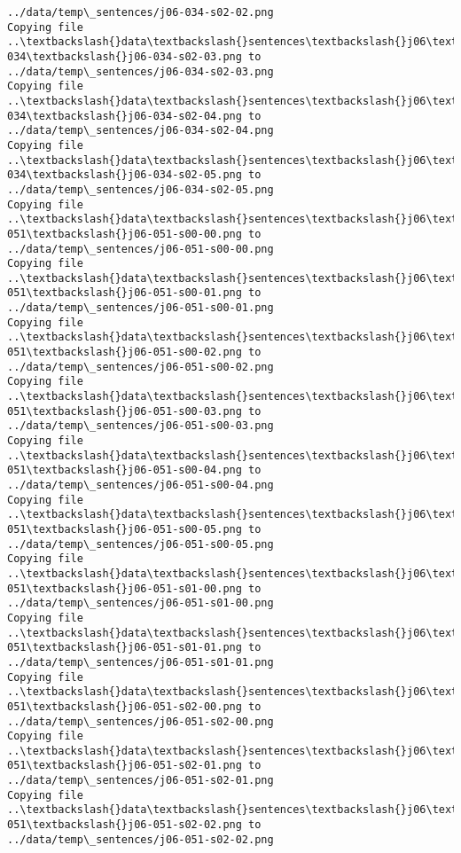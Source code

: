 \documentclass[11pt]{article}
\begin{document}
\begin{Verbatim}[commandchars=\\\{\}]
../data/temp\_sentences/j06-034-s02-02.png
Copying file ..\textbackslash{}data\textbackslash{}sentences\textbackslash{}j06\textbackslash{}j06-034\textbackslash{}j06-034-s02-03.png to
../data/temp\_sentences/j06-034-s02-03.png
Copying file ..\textbackslash{}data\textbackslash{}sentences\textbackslash{}j06\textbackslash{}j06-034\textbackslash{}j06-034-s02-04.png to
../data/temp\_sentences/j06-034-s02-04.png
Copying file ..\textbackslash{}data\textbackslash{}sentences\textbackslash{}j06\textbackslash{}j06-034\textbackslash{}j06-034-s02-05.png to
../data/temp\_sentences/j06-034-s02-05.png
Copying file ..\textbackslash{}data\textbackslash{}sentences\textbackslash{}j06\textbackslash{}j06-051\textbackslash{}j06-051-s00-00.png to
../data/temp\_sentences/j06-051-s00-00.png
Copying file ..\textbackslash{}data\textbackslash{}sentences\textbackslash{}j06\textbackslash{}j06-051\textbackslash{}j06-051-s00-01.png to
../data/temp\_sentences/j06-051-s00-01.png
Copying file ..\textbackslash{}data\textbackslash{}sentences\textbackslash{}j06\textbackslash{}j06-051\textbackslash{}j06-051-s00-02.png to
../data/temp\_sentences/j06-051-s00-02.png
Copying file ..\textbackslash{}data\textbackslash{}sentences\textbackslash{}j06\textbackslash{}j06-051\textbackslash{}j06-051-s00-03.png to
../data/temp\_sentences/j06-051-s00-03.png
Copying file ..\textbackslash{}data\textbackslash{}sentences\textbackslash{}j06\textbackslash{}j06-051\textbackslash{}j06-051-s00-04.png to
../data/temp\_sentences/j06-051-s00-04.png
Copying file ..\textbackslash{}data\textbackslash{}sentences\textbackslash{}j06\textbackslash{}j06-051\textbackslash{}j06-051-s00-05.png to
../data/temp\_sentences/j06-051-s00-05.png
Copying file ..\textbackslash{}data\textbackslash{}sentences\textbackslash{}j06\textbackslash{}j06-051\textbackslash{}j06-051-s01-00.png to
../data/temp\_sentences/j06-051-s01-00.png
Copying file ..\textbackslash{}data\textbackslash{}sentences\textbackslash{}j06\textbackslash{}j06-051\textbackslash{}j06-051-s01-01.png to
../data/temp\_sentences/j06-051-s01-01.png
Copying file ..\textbackslash{}data\textbackslash{}sentences\textbackslash{}j06\textbackslash{}j06-051\textbackslash{}j06-051-s02-00.png to
../data/temp\_sentences/j06-051-s02-00.png
Copying file ..\textbackslash{}data\textbackslash{}sentences\textbackslash{}j06\textbackslash{}j06-051\textbackslash{}j06-051-s02-01.png to
../data/temp\_sentences/j06-051-s02-01.png
Copying file ..\textbackslash{}data\textbackslash{}sentences\textbackslash{}j06\textbackslash{}j06-051\textbackslash{}j06-051-s02-02.png to
../data/temp\_sentences/j06-051-s02-02.png

\end{Verbatim}
\end{document}

